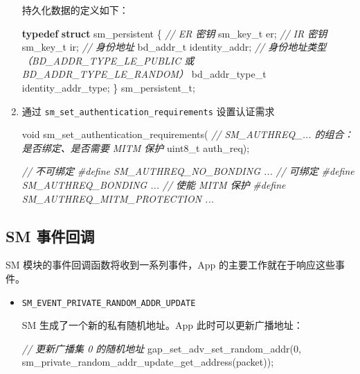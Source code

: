 \documentclass[
  12pt,
]{book}
\newenvironment{Shaded}{\begin{snugshade}}{\end{snugshade}}
\newcommand{\CommentTok}[1]{\textcolor[rgb]{0.56,0.35,0.01}{\textit{#1}}}
\newcommand{\DataTypeTok}[1]{\textcolor[rgb]{0.13,0.29,0.53}{#1}}
\newcommand{\DecValTok}[1]{\textcolor[rgb]{0.00,0.00,0.81}{#1}}
\newcommand{\KeywordTok}[1]{\textcolor[rgb]{0.13,0.29,0.53}{\textbf{#1}}}
\newcommand{\NormalTok}[1]{#1}
\newcommand{\PreprocessorTok}[1]{\textcolor[rgb]{0.56,0.35,0.01}{\textit{#1}}}
\begin{document}
\begin{enumerate}
  持久化数据的定义如下：

\begin{Shaded}
\begin{Highlighting}[]
\KeywordTok{typedef} \KeywordTok{struct}\NormalTok{ sm_persistent}
\NormalTok{\{}
  \CommentTok{// ER 密钥}
\NormalTok{  sm_key_t        er;}
  \CommentTok{// IR 密钥}
\NormalTok{  sm_key_t        ir;}
  \CommentTok{// 身份地址}
\NormalTok{  bd_addr_t       identity_addr;}
  \CommentTok{// 身份地址类型（BD_ADDR_TYPE_LE_PUBLIC 或 BD_ADDR_TYPE_LE_RANDOM）}
\NormalTok{  bd_addr_type_t  identity_addr_type;}
\NormalTok{\} sm_persistent_t;}
\end{Highlighting}
\end{Shaded}
\item
  通过 \texttt{sm\_set\_authentication\_requirements} 设置认证需求

\begin{Shaded}
\begin{Highlighting}[]
\DataTypeTok{void}\NormalTok{ sm_set_authentication_requirements(}
  \CommentTok{// SM_AUTHREQ_... 的组合：是否绑定、是否需要 MITM 保护}
  \DataTypeTok{uint8_t}\NormalTok{ auth_req);}

\CommentTok{// 不可绑定}
\PreprocessorTok{#define SM_AUTHREQ_NO_BONDING       ...}
\CommentTok{// 可绑定}
\PreprocessorTok{#define SM_AUTHREQ_BONDING          ...}
\CommentTok{// 使能 MITM 保护}
\PreprocessorTok{#define SM_AUTHREQ_MITM_PROTECTION  ...}
\end{Highlighting}
\end{Shaded}
\end{enumerate}

\hypertarget{sm-ux4e8bux4ef6ux56deux8c03}{%
\subsection{SM 事件回调}\label{sm-ux4e8bux4ef6ux56deux8c03}}

SM 模块的事件回调函数将收到一系列事件，App 的主要工作就在于响应这些事件。

\begin{itemize}
\item
  \texttt{SM\_EVENT\_PRIVATE\_RANDOM\_ADDR\_UPDATE}

  SM 生成了一个新的私有随机地址。App 此时可以更新广播地址：

\begin{Shaded}
\begin{Highlighting}[]
\CommentTok{// 更新广播集 0 的随机地址}
\NormalTok{gap_set_adv_set_random_addr(}\DecValTok{0}\NormalTok{,}
\NormalTok{  sm_private_random_addr_update_get_address(packet));}
\end{Highlighting}
\end{Shaded}
\end{itemize}
\end{document}

